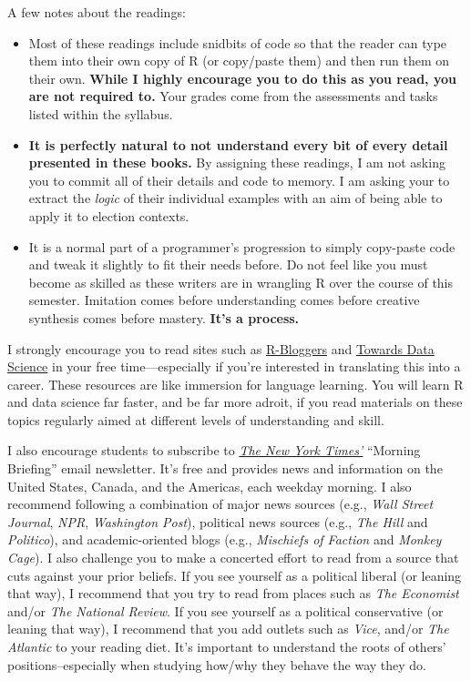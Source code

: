 \documentclass[11pt]{article}
\def\doubleq#1{``#1''}
\begin{document}
A few notes about the readings:
\begin{itemize}
\item Most of these readings include snidbits of code so that the reader can type them into their own copy of R (or copy/paste them) and then run them on their own. \textbf{While I highly encourage you to do this as you read, you are not required to.} Your grades come from the assessments and tasks listed within the syllabus. 
\item \textbf{It is perfectly natural to not understand every bit of every detail presented in these books.} By assigning these readings, I am not asking you to commit all of their details and code to memory. I am asking your to extract the \textit{logic} of their individual examples with an aim of being able to apply it to election contexts.
\item It is a normal part of a programmer's progression to simply copy-paste code and tweak it slightly to fit their needs before. Do not feel like you must become as skilled as these writers are in wrangling R over the course of this semester. Imitation comes before understanding comes before creative synthesis comes before mastery. \textbf{It's a process.}
\end{itemize}

I strongly encourage you to read sites such as \href{https://www.r-bloggers.com/}{R-Bloggers} and \href{https://towardsdatascience.com/}{Towards Data Science} in your free time---especially if you're interested in translating this into a career. These resources are like immersion for language learning. You will learn R and data science far faster, and be far more adroit, if you read materials on these topics regularly aimed at different levels of understanding and skill. 

\vspace{1em}
I also encourage students to subscribe to \textit{{\href{https://www.nytimes.com/newsletters}{The New York Times'}}} \doubleq{Morning Briefing} email newsletter. It's free and provides news and information on the United States, Canada, and the Americas, each weekday morning. I also recommend following a combination of major news sources (e.g., \textit{Wall Street Journal}, \textit{NPR}, \textit{Washington Post}), political news sources (e.g., \textit{The Hill} and \textit{Politico}), and academic-oriented blogs (e.g., \textit{Mischiefs of Faction} and \textit{Monkey Cage}). I also challenge you to make a concerted effort to read from a source that cuts against your prior beliefs. If you see yourself as a political liberal (or leaning that way), I recommend that you try to read from places such as \textit{The Economist} and/or \textit{The National Review}. If you see yourself as a political conservative (or leaning that way), I recommend that you add outlets such as \textit{Vice}, and/or \textit{The Atlantic} to your reading diet. It's important to understand the roots of others' positions--especially when studying how/why they behave the way they do.
\end{document}
